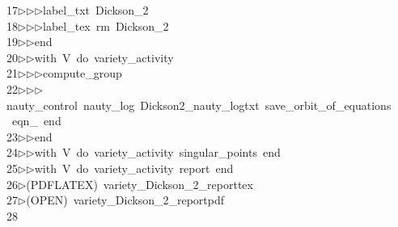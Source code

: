 \begin{tabbing}
17\>$\triangleright$\>$\triangleright$\>$\triangleright$\>label\_txt\ Dickson\_2\ \\[0pt]
18\>$\triangleright$\>$\triangleright$\>$\triangleright$\>label\_tex\ rm\ Dickson\_2\ \\[0pt]
19\>$\triangleright$\>$\triangleright$\>end\ \\[0pt]
20\>$\triangleright$\>$\triangleright$\>with\ V\ do\ variety\_activity\ \\[0pt]
21\>$\triangleright$\>$\triangleright$\>$\triangleright$\>compute\_group\ \\[0pt]
22\>$\triangleright$\>$\triangleright$\>$\triangleright$\>nauty\_control\ nauty\_log\ Dickson2\_nauty\_logtxt\ save\_orbit\_of\_equations\\[0pt]
\>\ eqn\_\ end\ \\[0pt]
23\>$\triangleright$\>$\triangleright$\>end\ \\[0pt]
24\>$\triangleright$\>$\triangleright$\>with\ V\ do\ variety\_activity\ singular\_points\ end\ \\[0pt]
25\>$\triangleright$\>$\triangleright$\>with\ V\ do\ variety\_activity\ report\ end\\[0pt]
26\>$\triangleright$\>(PDFLATEX)\ variety\_Dickson\_2\_reporttex\\[0pt]
27\>$\triangleright$\>(OPEN)\ variety\_Dickson\_2\_reportpdf\\[0pt]
28\>\end{tabbing}
